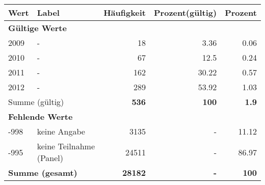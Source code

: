      \begin{longtable}{lXrrr}
     \toprule
     \textbf{Wert} & \textbf{Label} & \textbf{Häufigkeit} & \textbf{Prozent(gültig)} & \textbf{Prozent} \\
     \endhead
     \midrule
     \multicolumn{5}{l}{\textbf{Gültige Werte}}\\

     2009 &
     \multicolumn{1}{X}{ -  } &


       \num{18} &
       \num[round-mode=places,round-precision=2]{3.36} &
         \num[round-mode=places,round-precision=2]{0.06} \\

     2010 &
     \multicolumn{1}{X}{ -  } &


       \num{67} &
       \num[round-mode=places,round-precision=2]{12.5} &
         \num[round-mode=places,round-precision=2]{0.24} \\

     2011 &
     \multicolumn{1}{X}{ -  } &


       \num{162} &
       \num[round-mode=places,round-precision=2]{30.22} &
         \num[round-mode=places,round-precision=2]{0.57} \\

     2012 &
     \multicolumn{1}{X}{ -  } &


       \num{289} &
       \num[round-mode=places,round-precision=2]{53.92} &
         \num[round-mode=places,round-precision=2]{1.03} \\
     \midrule
     \multicolumn{2}{l}{Summe (gültig)} &
       \textbf{\num{536}} &
     \textbf{100} &
       \textbf{\num[round-mode=places,round-precision=2]{1.9}} \\
     \multicolumn{5}{l}{\textbf{Fehlende Werte}}\\
       -998 &
       keine Angabe &
         \num{3135} &
        - &
         \num[round-mode=places,round-precision=2]{11.12} \\
       -995 &
       keine Teilnahme (Panel) &
         \num{24511} &
        - &
         \num[round-mode=places,round-precision=2]{86.97} \\
     \midrule
     \multicolumn{2}{l}{\textbf{Summe (gesamt)}} &
          \textbf{\num{28182}} &
        \textbf{-} &
        \textbf{100} \\
     \bottomrule
     \end{longtable}
     
